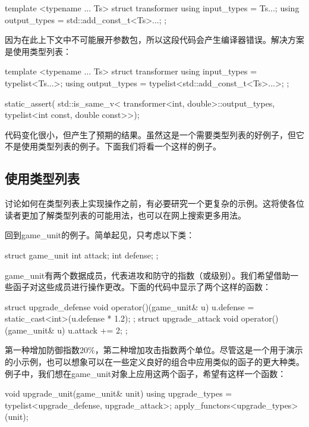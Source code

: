\begin{cppcode}
template <typename ... Ts>
struct transformer
{
	using input_types = Ts...;
	using output_types = std::add_const_t<Ts>...;
};
\end{cppcode}

因为在此上下文中不可能展开参数包，所以这段代码会产生编译器错误。解决方案是使用类型列表：

\begin{cppcode}
template <typename ... Ts>
struct transformer
{
	using input_types = typelist<Ts...>;
	using output_types = typelist<std::add_const_t<Ts>...>;
};

static_assert(
	std::is_same_v<
		transformer<int, double>::output_types,
		typelist<int const, double const>>);
\end{cppcode}

代码变化很小，但产生了预期的结果。虽然这是一个需要类型列表的好例子，但它不是使用类型列表的例子。下面我们将看一个这样的例子。

\subsection{使用类型列表}

讨论如何在类型列表上实现操作之前，有必要研究一个更复杂的示例。这将使各位读者更加了解类型列表的可能用法，也可以在网上搜索更多用法。

回到game_unit的例子。简单起见，只考虑以下类：

\begin{cppcode}
struct game_unit
{
	int attack;
	int defense;
};
\end{cppcode}

game_unit有两个数据成员，代表进攻和防守的指数（或级别）。我们希望借助一些函子对这些成员进行操作更改。下面的代码中显示了两个这样的函数：

\begin{cppcode}
struct upgrade_defense
{
	void operator()(game_unit& u)
	{
		u.defense = static_cast<int>(u.defense * 1.2);
	}
};
struct upgrade_attack
{
	void operator()(game_unit& u)
	{
		u.attack += 2;
	}
};
\end{cppcode}

第一种增加防御指数20\%，第二种增加攻击指数两个单位。尽管这是一个用于演示的小示例，也可以想象可以在一些定义良好的组合中应用类似的函子的更大种类。例子中，我们想在game_unit对象上应用这两个函子，希望有这样一个函数：

\begin{cppcode}
void upgrade_unit(game_unit& unit)
{
	using upgrade_types =
		typelist<upgrade_defense, upgrade_attack>;
	apply_functors<upgrade_types>{}(unit);
}
\end{cppcode}

